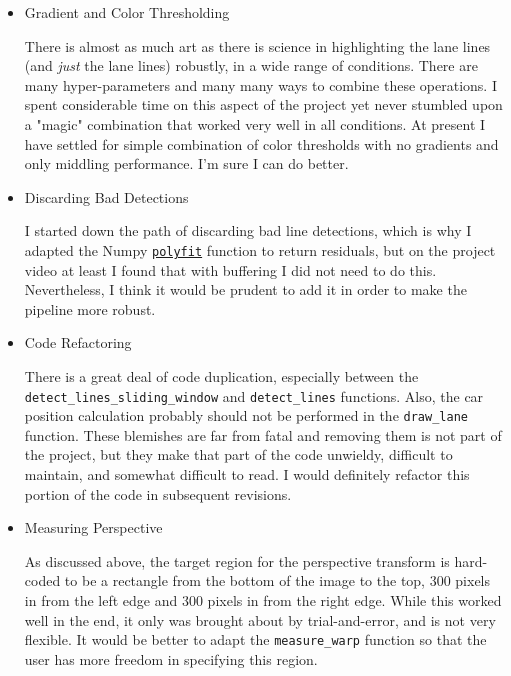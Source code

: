 \documentclass[11pt]{article}
\begin{document}
\begin{itemize}
\item Gradient and Color Thresholding
\label{sec-1-3-3-1}

There is almost as much art as there is science in
highlighting the lane lines (and \emph{just} the lane lines)
robustly, in a wide range of conditions.  There are many
hyper-parameters and many many ways to combine these
operations.  I spent considerable time on this aspect of the
project yet never stumbled upon a "magic" combination that
worked very well in all conditions.  At present I have settled
for simple combination of color thresholds with no gradients
and only middling performance.  I'm sure I can do better.

\item Discarding Bad Detections
\label{sec-1-3-3-2}

I started down the path of discarding bad line detections,
which is why I adapted the Numpy \href{https://docs.scipy.org/doc/numpy/reference/generated/numpy.polyfit.html#numpy-polyfit}{\texttt{polyfit}} function to return
residuals, but on the project video at least I found that with
buffering I did not need to do this.  Nevertheless, I think it
would be prudent to add it in order to make the pipeline more
robust.  

\item Code Refactoring
\label{sec-1-3-3-3}

There is a great deal of code duplication, especially between
the \texttt{detect\_lines\_sliding\_window} and \texttt{detect\_lines}
functions.  Also, the car position calculation probably should
not be performed in the \texttt{draw\_lane} function.  These blemishes
are far from fatal and removing them is not part of the
project, but they make that part of the code unwieldy,
difficult to maintain, and somewhat difficult to read.  I
would definitely refactor this portion of the code in
subsequent revisions.  

\item Measuring Perspective
\label{sec-1-3-3-4}

As discussed above, the target region for the perspective
transform is hard-coded to be a rectangle from the bottom of
the image to the top, 300 pixels in from the left edge and 300
pixels in from the right edge.  While this worked well in the
end, it only was brought about by trial-and-error, and is not
very flexible.  It would be better to adapt the \texttt{measure\_warp}
function so that the user has more freedom in specifying this
region.
\end{itemize}
\end{document}
